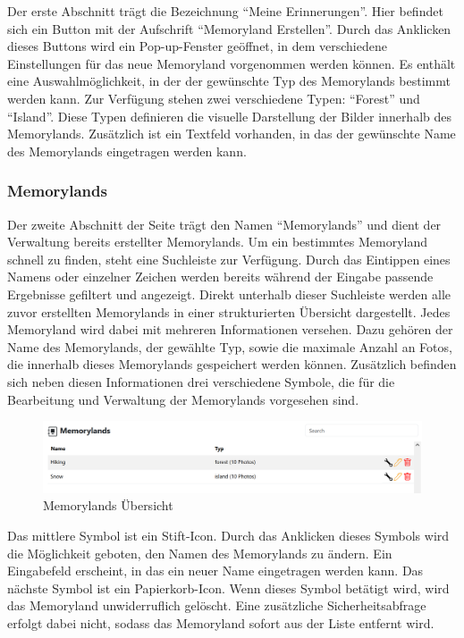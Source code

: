 Der erste Abschnitt trägt die Bezeichnung ``Meine Erinnerungen''. Hier befindet sich ein Button mit der Aufschrift ``Memoryland Erstellen''. Durch das Anklicken dieses Buttons wird ein Pop-up-Fenster geöffnet, in dem verschiedene Einstellungen für das neue Memoryland vorgenommen werden können. Es enthält eine Auswahlmöglichkeit, in der der gewünschte Typ des Memorylands bestimmt werden kann. Zur Verfügung stehen zwei verschiedene Typen: ``Forest'' und ``Island''. Diese Typen definieren die visuelle Darstellung der Bilder innerhalb des Memorylands. Zusätzlich ist ein Textfeld vorhanden, in das der gewünschte Name des Memorylands eingetragen werden kann.



\subsubsection{Memorylands}

Der zweite Abschnitt der Seite trägt den Namen ``Memorylands'' und dient der Verwaltung bereits erstellter Memorylands. Um ein bestimmtes Memoryland schnell zu finden, steht eine Suchleiste zur Verfügung. Durch das Eintippen eines Namens oder einzelner Zeichen werden bereits während der Eingabe passende Ergebnisse gefiltert und angezeigt. Direkt unterhalb dieser Suchleiste werden alle zuvor erstellten Memorylands in einer strukturierten Übersicht dargestellt. Jedes Memoryland wird dabei mit mehreren Informationen versehen. Dazu gehören der Name des Memorylands, der gewählte Typ, sowie die maximale Anzahl an Fotos, die innerhalb dieses Memorylands gespeichert werden können. Zusätzlich befinden sich neben diesen Informationen drei verschiedene Symbole, die für die Bearbeitung und Verwaltung der Memorylands vorgesehen sind.

\begin{figure} [h t]
    \centering
    \includegraphics[scale=0.6]{pics/all_worlds_teil2.PNG}
    \caption{Memorylands Übersicht}
    \label{fig:all-worlds-memorylands}
\end{figure}

Das mittlere Symbol ist ein Stift-Icon. Durch das Anklicken dieses Symbols wird die Möglichkeit geboten, den Namen des Memorylands zu ändern. Ein Eingabefeld erscheint, in das ein neuer Name eingetragen werden kann. Das nächste Symbol ist ein Papierkorb-Icon. Wenn dieses Symbol betätigt wird, wird das Memoryland unwiderruflich gelöscht. Eine zusätzliche Sicherheitsabfrage erfolgt dabei nicht, sodass das Memoryland sofort aus der Liste entfernt wird. 

